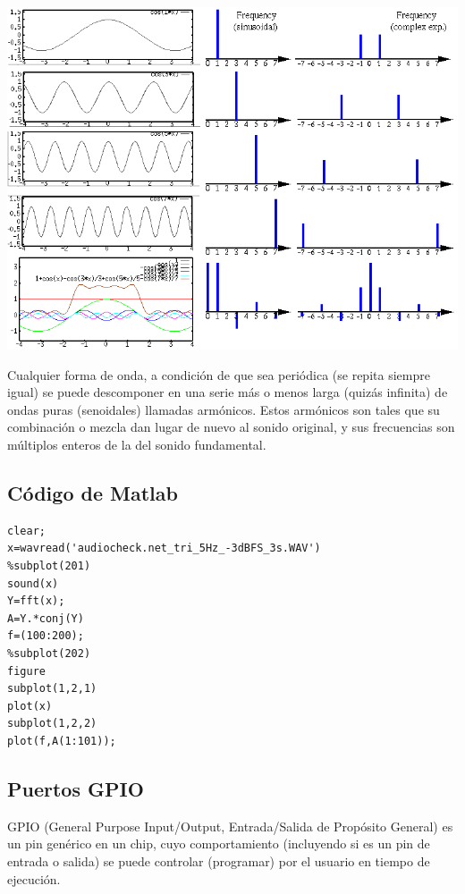 \documentclass[10pt,a4paper]{book}
\begin{document}
\begin{center}
	\includegraphics[scale=0.45]{AudioFourier.png}\\
\end{center}

Cualquier forma de onda, a condición de que sea periódica (se repita siempre igual) se puede descomponer en una serie más o menos larga (quizás infinita) de ondas puras (senoidales) llamadas armónicos. Estos armónicos son tales que su combinación o mezcla dan lugar de nuevo al sonido original, y sus frecuencias son múltiplos enteros de la del sonido fundamental.\\

\subsection{Código de Matlab}

\begin{verbatim}
clear;
x=wavread('audiocheck.net_tri_5Hz_-3dBFS_3s.WAV')
%subplot(201)
sound(x)
Y=fft(x);
A=Y.*conj(Y)
f=(100:200);
%subplot(202)
figure
subplot(1,2,1)
plot(x)
subplot(1,2,2)
plot(f,A(1:101));

\end{verbatim}



\subsection{Puertos GPIO}

GPIO (General Purpose Input/Output, Entrada/Salida de Propósito General) es un pin genérico en un chip, cuyo comportamiento (incluyendo si es un pin de entrada o salida) se puede controlar (programar) por el usuario en tiempo de ejecución.\\
\end{document}
